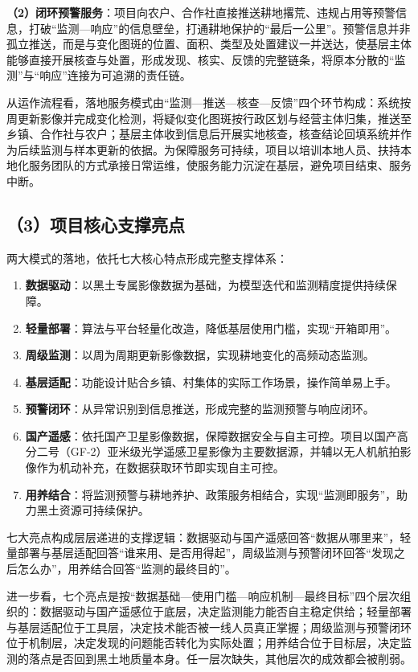 \documentclass[12pt, a4paper]{ctexart}
\begin{document}
\textbf{（2）闭环预警服务}：项目向农户、合作社直接推送耕地撂荒、违规占用等预警信息，打破“监测—响应”的信息壁垒，打通耕地保护的“最后一公里”。预警信息并非孤立推送，而是与变化图斑的位置、面积、类型及处置建议一并送达，使基层主体能够直接开展核查与处置，形成发现、核实、反馈的完整链条，将原本分散的“监测”与“响应”连接为可追溯的责任链。

从运作流程看，落地服务模式由“监测—推送—核查—反馈”四个环节构成：系统按周更新影像并完成变化检测，将疑似变化图斑按行政区划与经营主体归集，推送至乡镇、合作社与农户；基层主体收到信息后开展实地核查，核查结论回填系统并作为后续监测与样本更新的依据。为保障服务可持续，项目以培训本地人员、扶持本地化服务团队的方式承接日常运维，使服务能力沉淀在基层，避免项目结束、服务中断。

\subsection{（3）项目核心支撑亮点}

两大模式的落地，依托七大核心特点形成完整支撑体系：

\begin{enumerate}
  \item \textbf{数据驱动}：以黑土专属影像数据为基础，为模型迭代和监测精度提供持续保障。
  \item \textbf{轻量部署}：算法与平台轻量化改造，降低基层使用门槛，实现“开箱即用”。
  \item \textbf{周级监测}：以周为周期更新影像数据，实现耕地变化的高频动态监测。
  \item \textbf{基层适配}：功能设计贴合乡镇、村集体的实际工作场景，操作简单易上手。
  \item \textbf{预警闭环}：从异常识别到信息推送，形成完整的监测预警与响应闭环。
  \item \textbf{国产遥感}：依托国产卫星影像数据，保障数据安全与自主可控。项目以国产高分二号（GF-2）亚米级光学遥感卫星影像为主要数据源，并辅以无人机航拍影像作为机动补充，在数据获取环节即实现自主可控。
  \item \textbf{用养结合}：将监测预警与耕地养护、政策服务相结合，实现“监测即服务”，助力黑土资源可持续保护。
\end{enumerate}

七大亮点构成层层递进的支撑逻辑：数据驱动与国产遥感回答“数据从哪里来”，轻量部署与基层适配回答“谁来用、是否用得起”，周级监测与预警闭环回答“发现之后怎么办”，用养结合回答“监测的最终目的”。

进一步看，七个亮点是按“数据基础—使用门槛—响应机制—最终目标”四个层次组织的：数据驱动与国产遥感位于底层，决定监测能力能否自主稳定供给；轻量部署与基层适配位于工具层，决定技术能否被一线人员真正掌握；周级监测与预警闭环位于机制层，决定发现的问题能否转化为实际处置；用养结合位于目标层，决定监测的落点是否回到黑土地质量本身。任一层次缺失，其他层次的成效都会被削弱。
\end{document}
